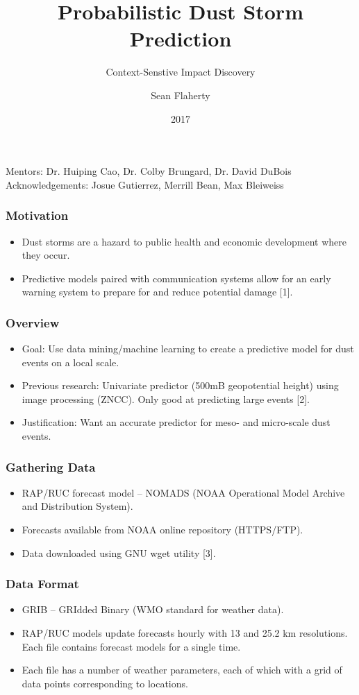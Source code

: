 \documentclass{beamer}
\title{Probabilistic Dust Storm Prediction}
\subtitle{Context-Senstive Impact Discovery}
\author{Sean Flaherty}
\date{2017}
\begin{document}
\begin{frame}
	\titlepage
	Mentors: Dr. Huiping Cao, Dr. Colby Brungard, Dr. David DuBois\\
	Acknowledgements: Josue Gutierrez, Merrill Bean, Max Bleiweiss

\end{frame}
\begin{frame}
	\frametitle{Motivation}
	\begin{itemize}
		\item
			Dust storms are a hazard to public health and economic development where they occur.
		\item
			Predictive models paired with communication systems allow for an early warning system to prepare for and reduce potential damage [1].
	\end{itemize}

\end{frame}
\begin{frame}
	\frametitle{Overview}
	\begin{itemize}
		\item
			Goal: Use data mining/machine learning to create a predictive model for dust events on a local scale.
		\item
			Previous research: Univariate predictor (500mB geopotential height) using image processing (ZNCC). Only good at predicting large events [2]. 
		\item
			Justification: Want an accurate predictor for meso- and micro-scale dust events.
	\end{itemize}

\end{frame}
\begin{frame}
	\frametitle{Gathering Data}
	\begin{itemize}
		\item<-1->
			RAP/RUC forecast model -- NOMADS (NOAA Operational Model Archive and Distribution System).
		\item<-2-> Forecasts available from NOAA online repository (HTTPS/FTP).
		\item<-3-> Data downloaded using GNU wget utility [3].
	\end{itemize}
\end{frame}
\begin{frame}
	\frametitle{Data Format}
	\begin{itemize}
		\item
			GRIB -- GRIdded Binary (WMO standard for weather data).
		\item
			RAP/RUC models update forecasts hourly with 13 and 25.2 km resolutions.
		\ite
			Each file contains forecast models for a single time.
		\item
			Each file has a number of weather parameters, each of which with a grid of data points corresponding to locations.	
	\end{itemize}
\end{frame}
\end{document}
